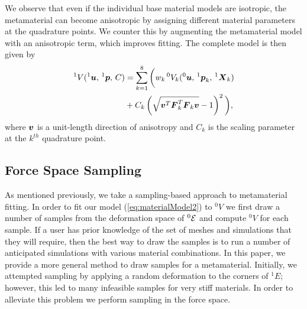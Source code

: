 We observe that even if the individual base material models are isotropic, the metamaterial can become anisotropic by assigning different material parameters at the quadrature points. We counter this by augmenting the metamaterial model with an anisotropic term, which improves fitting.
The complete model is then given by
\begin{align}
\begin{split}
^1V(^1\mbox{$\bm{u}$}, \, ^1\mbox{$\bm{p}$}, \, C) &= \sum_{k=1}^8 \bigg( w_k \, ^0V_k(^0\mbox{$\bm{u}$}, \, ^1\mbox{$\bm{p}$}_k, \, ^1\mbox{$\bm{X}$}_k)\\
& + C_k\left( \sqrt{\mbox{$\bm{v}$}^T\mbox{$\bm{F}$}_k^T\mbox{$\bm{F}$}_k\mbox{$\bm{v}$}} - 1\right)^2\bigg),\\
\label{eq:materialModel2}
\end{split}
\end{align}
where $\mbox{$\bm{v}$}$ is a unit-length direction of anisotropy and $C_k$ is the scaling parameter at the $k^{th}$ quadrature point. 

\subsection{Force Space Sampling}
\label{sec:force_space_sampling}
As mentioned previously, we take a sampling-based approach to metamaterial fitting. In order to fit our model (\autoref{eq:materialModel2}) to $^0V$ we first draw a number of samples from the deformation space of $^0\mathcal{E}$ and compute $^0V$ for each sample.
If a user has prior knowledge of the set of meshes and simulations that they will require, then the best way to draw the samples is to run a number of anticipated simulations with various material combinations.
In this paper, we provide a more general method to draw samples for a metamaterial.
Initially, we attempted sampling by applying a random deformation to the corners of $^1\mathit{E}$; however, this led to many infeasible samples for very stiff materials.
In order to alleviate this problem we perform sampling in the force space.

